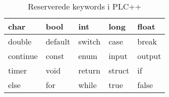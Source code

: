 

\begin{table}[H]
\centering
\footnotesize
\begin{tabular}{|l|l|l|l|l|}
\hline
char     & bool    & int    & long   & float  \\ \hline
double   & default & switch & case   & break  \\ \hline
continue & const   & enum   & input  & output \\ \hline
timer    & void    & return & struct & if     \\ \hline
else     & for     & while  & true   & false  \\ \hline

\end{tabular}
	\caption{Reserverede keywords i PLC++}
    \label{tab:keywords}
\end{table}